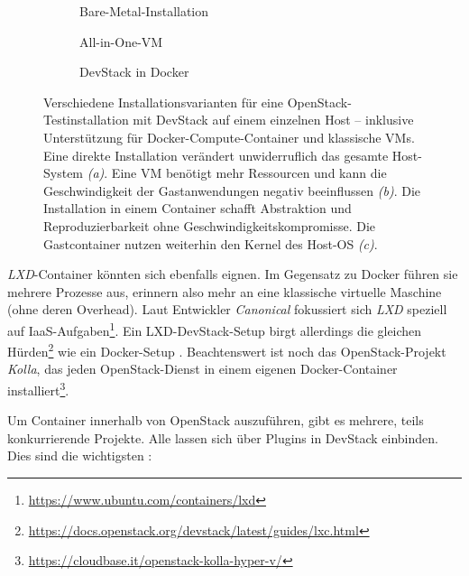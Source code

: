 \begin{figure}[ht]
	\centering
	\begin{subfigure}[b]{0.29\textwidth}
		\def\svgwidth{\linewidth}
		{\tiny \textsf{
			}}
		\caption{Bare-Metal-Installation}
		\label{fig:sub:devstack-bare-metal}
	\end{subfigure}\hfill%
	\begin{subfigure}[b]{0.31\textwidth}
		\def\svgwidth{\linewidth}
		{\tiny \textsf{
			}}
		\caption{All-in-One-VM}
		\label{fig:sub:devstack-vm}
	\end{subfigure}\hfill%
	\begin{subfigure}[b]{0.31\textwidth}
		\def\svgwidth{\linewidth}
		{\tiny \textsf{
			}}
		\caption{DevStack in Docker}
		\label{fig:sub:devstack-docker}
	\end{subfigure}
	
	\caption{Verschiedene Installationsvarianten für eine OpenStack-Testinstallation mit DevStack auf einem einzelnen Host -- inklusive Unterstützung für Docker-Compute-Container und klassische VMs. Eine direkte Installation verändert unwiderruflich das gesamte Host-System \emph{(a)}. Eine VM benötigt mehr Ressourcen und kann die Geschwindigkeit der Gastanwendungen negativ beeinflussen \emph{(b)}. Die Installation in einem Container schafft Abstraktion und Reproduzierbarkeit ohne Geschwindigkeitskompromisse. Die Gastcontainer nutzen weiterhin den Kernel des Host-OS \emph{(c)}.}
	\label{fig:devstack}
\end{figure}

\emph{LXD}-Container könnten sich ebenfalls eignen. Im Gegensatz zu Docker führen sie mehrere Prozesse aus, erinnern also mehr an eine klassische virtuelle Maschine (ohne deren Overhead). Laut Entwickler \emph{Canonical} fokussiert sich \emph{LXD} speziell auf IaaS-Aufgaben\footnote{\url{https://www.ubuntu.com/containers/lxd}}. Ein LXD-DevStack-Setup birgt allerdings die gleichen Hürden\footnote{\url{https://docs.openstack.org/devstack/latest/guides/lxc.html}} wie ein Docker-Setup \cite{graber:2016:openstack-lxd}. Beachtenswert ist noch das OpenStack-Projekt \emph{Kolla}, das jeden OpenStack-Dienst in einem eigenen Docker-Container installiert\footnote{\url{https://cloudbase.it/openstack-kolla-hyper-v/}}.

Um Container innerhalb von OpenStack auszuführen, gibt es mehrere, teils konkurrierende Projekte. Alle lassen sich über Plugins in DevStack einbinden. Dies sind die wichtigsten \cite{singh:2017:containers-openstack}:

